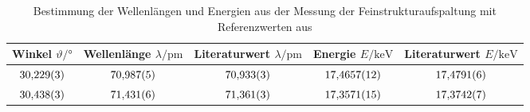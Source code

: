 \begin{table}[htbp]
   \centering
\caption{Bestimmung der Wellenlängen und Energien aus der Messung der Feinstrukturaufspaltung mit Referenzwerten aus \cite{nist_xray_database}}
\begin{tabular}{c c c c c}
\hline Winkel $\vartheta/ \unit{\degree}$ & Wellenlänge $\lambda / \unit{\pm}$ & Literaturwert $\lambda / \unit{\pm}$ & Energie $E / \unit{\kilo\electronvolt}$  & Literaturwert $E / \unit{\kilo\electronvolt}$  \\ 
\hline
$\num{30.229\pm 0.003}$ & $\num{70.987\pm 0.005}$ & $\num{70.933\pm 0.003}$ & $\num{17.4657\pm 0.0012}$ & $\num{17.4791\pm 0.0006}$ \\
$\num{30.438\pm 0.003}$ & $\num{71.431\pm 0.006}$ & $\num{71.361\pm 0.003}$ & $\num{17.3571\pm 0.0015}$ & $\num{17.3742\pm 0.0007}$ \\
\hline\end{tabular}
\label{tab:feinstruktur}
\end{table}